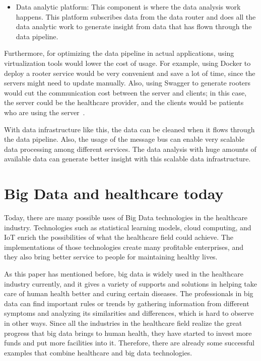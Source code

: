 \begin{itemize}
	\item Data analytic platform: This component is where the data analysis 
	work happens. This platform subscribes data from the data router and does 
	all the data analytic work to generate insight from data that has flown 
	through the data pipeline. 
\end{itemize}

Furthermore, for optimizing the data pipeline in actual applications, 
using virtualization tools would lower the cost of usage. For example, 
using Docker to deploy a rooter service would be very convenient and 
save a lot of time, since the servers might need to update manually. 
Also, using Swagger to generate rooters would cut the 
communication cost between the server and clients; in this case, the 
server could be the healthcare provider, and the clients would be 
patients who are using the server~\cite{CornellMedical2015}.

With data infrastructure like this, the data can be cleaned when it flows 
through the data pipeline. Also, the usage of the message bus can enable 
very scalable data processing among different services. The data 
analysis with huge amounts of available data can generate better 
insight with this scalable data infrastructure. 

\section{Big Data and healthcare today}
Today, there are many possible uses of Big Data technologies 
in the healthcare industry. Technologies such as 
statistical learning models, cloud 
computing, and IoT enrich the possibilities of what the healthcare 
field could achieve. The implementations of those technologies create 
many profitable enterprises, and they also bring better service to people 
for maintaining healthy lives.

As this paper has mentioned before, 
big data is widely used in the healthcare 
industry currently, and it gives a variety of supports 
and solutions in helping 
take care of human health better and curing certain 
diseases. The 
professionals 
in big data can find important rules or trends by 
gathering information from different symptoms and analyzing 
its similarities 
and differences, which is hard to observe in other ways. 
Since all the 
industries in the healthcare field realize the great 
progress that big data 
brings to human health, they have started to 
invest more funds and put more 
facilities into it. Therefore, there are already 
some successful examples that 
combine healthcare and big data technologies.

